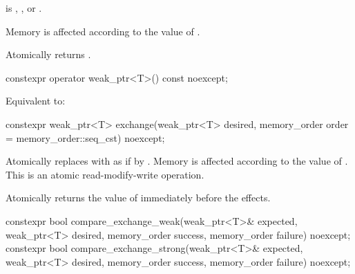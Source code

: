 \begin{itemdescr}
\pnum
\expects
{} is
,
, or
.

\pnum
\effects
Memory is affected according to the value of .

\pnum
\returns
Atomically returns .
\end{itemdescr}

%
\begin{itemdecl}
constexpr operator weak_ptr<T>() const noexcept;
\end{itemdecl}

\begin{itemdescr}
\pnum
\effects
Equivalent to: 
\end{itemdescr}

%
\begin{itemdecl}
constexpr weak_ptr<T> exchange(weak_ptr<T> desired,
                               memory_order order = memory_order::seq_cst) noexcept;
\end{itemdecl}

\begin{itemdescr}
\pnum
\effects
Atomically replaces  with 
as if by .
Memory is affected according to the value of .
This is an atomic read-modify-write operation.

\pnum
\returns
Atomically returns the value of  immediately before the effects.
\end{itemdescr}

%
\begin{itemdecl}
constexpr bool compare_exchange_weak(weak_ptr<T>& expected, weak_ptr<T> desired,
                                     memory_order success, memory_order failure) noexcept;
constexpr bool compare_exchange_strong(weak_ptr<T>& expected, weak_ptr<T> desired,
                                       memory_order success, memory_order failure) noexcept;
\end{itemdecl}


